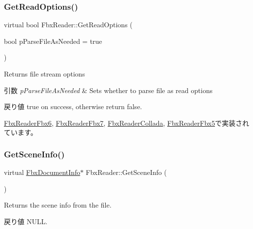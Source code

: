 \subsubsection{\texorpdfstring{Get\+Read\+Options()}{GetReadOptions()}}
{\footnotesize\ttfamily virtual bool Fbx\+Reader\+::\+Get\+Read\+Options (\begin{DoxyParamCaption}\item[{bool}]{p\+Parse\+File\+As\+Needed = {\ttfamily true} }\end{DoxyParamCaption})\hspace{0.3cm}{\ttfamily [pure virtual]}}

Returns file stream options 
\begin{DoxyParams}{引数}
{\em p\+Parse\+File\+As\+Needed} & Sets whether to parse file as read options \\
\hline
\end{DoxyParams}
\begin{DoxyReturn}{戻り値}
true on success, otherwise return false. 
\end{DoxyReturn}


\hyperlink{class_fbx_reader_fbx6_afe24d36b1c38806c9ace6a6d1a782b88}{Fbx\+Reader\+Fbx6}, \hyperlink{class_fbx_reader_fbx7_ac8d749c6a5f5c47573f27c26383401de}{Fbx\+Reader\+Fbx7}, \hyperlink{class_fbx_reader_collada_a23cea871d527b8695ebdeade47b1938e}{Fbx\+Reader\+Collada}, \hyperlink{class_fbx_reader_fbx5_a30c6a2a6f02fddffecec9cabf9f51ed7}{Fbx\+Reader\+Fbx5}で実装されています。

\mbox{\label{class_fbx_reader_acb928634641ad5f99d709478c7a234be}} 
\subsubsection{\texorpdfstring{Get\+Scene\+Info()}{GetSceneInfo()}}
{\footnotesize\ttfamily virtual \hyperlink{class_fbx_document_info}{Fbx\+Document\+Info}$\ast$ Fbx\+Reader\+::\+Get\+Scene\+Info (\begin{DoxyParamCaption}{ }\end{DoxyParamCaption})\hspace{0.3cm}{\ttfamily [virtual]}}

Returns the scene info from the file. \begin{DoxyReturn}{戻り値}
N\+U\+LL. 
\end{DoxyReturn}


